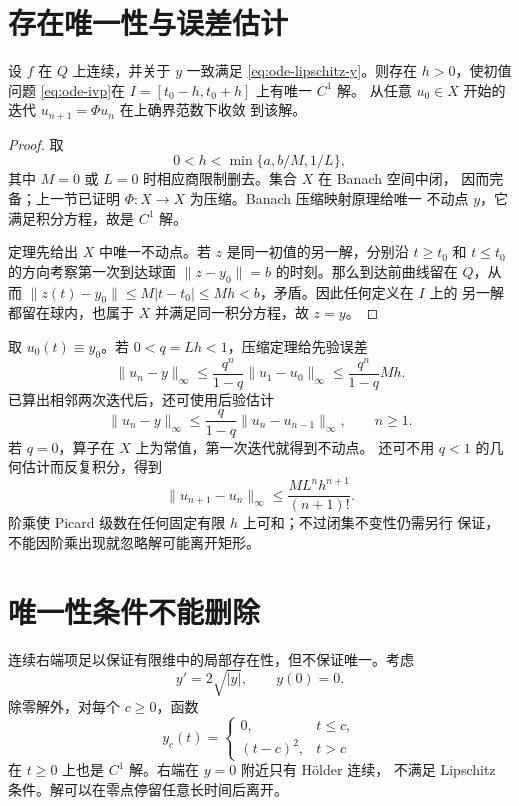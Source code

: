 \section{存在唯一性与误差估计}

\begin{theorem}\label{thm:picard-lindelof}
设 \(f\) 在 \(Q\) 上连续，并关于 \(y\) 一致满足
\eqref{eq:ode-lipschitz-y}。则存在 \(h>0\)，使初值问题
\eqref{eq:ode-ivp}在 \(I=[t_0-h,t_0+h]\) 上有唯一 \(C^1\) 解。
从任意 \(u_0\in X\) 开始的迭代 \(u_{n+1}=\Phi u_n\) 在上确界范数下收敛
到该解。
\end{theorem}
\begin{proof}
取
\[
 0<h<\min\{a,b/M,1/L\},
\]
其中 \(M=0\) 或 \(L=0\) 时相应商限制删去。集合 \(X\) 在 Banach 空间中闭，
因而完备；上一节已证明 \(\Phi:X\to X\) 为压缩。Banach 压缩映射原理给唯一
不动点 \(y\)，它满足积分方程，故是 \(C^1\) 解。

定理先给出 \(X\) 中唯一不动点。若 \(z\) 是同一初值的另一解，分别沿
\(t\ge t_0\) 和 \(t\le t_0\) 的方向考察第一次到达球面
\(\|z-y_0\|=b\) 的时刻。那么到达前曲线留在 \(Q\)，从而
\(\|z(t)-y_0\|\le M|t-t_0|\le Mh<b\)，矛盾。因此任何定义在 \(I\) 上的
另一解都留在球内，也属于 \(X\) 并满足同一积分方程，故 \(z=y\)。
\end{proof}

取 \(u_0(t)\equiv y_0\)。若 \(0<q=Lh<1\)，压缩定理给先验误差
\[
 \|u_n-y\|_\infty\le\frac{q^n}{1-q}\|u_1-u_0\|_\infty
 \le\frac{q^n}{1-q}Mh.
\]
已算出相邻两次迭代后，还可使用后验估计
\[
 \|u_n-y\|_\infty\le\frac q{1-q}\|u_n-u_{n-1}\|_\infty,
 \qquad n\ge1.
\]
若 \(q=0\)，算子在 \(X\) 上为常值，第一次迭代就得到不动点。
还可不用 \(q<1\) 的几何估计而反复积分，得到
\[
 \|u_{n+1}-u_n\|_\infty
 \le \frac{M L^n h^{n+1}}{(n+1)!}.
\]
阶乘使 Picard 级数在任何固定有限 \(h\) 上可和；不过闭集不变性仍需另行
保证，不能因阶乘出现就忽略解可能离开矩形。

\section{唯一性条件不能删除}

连续右端项足以保证有限维中的局部存在性，但不保证唯一。考虑
\[
 y'=2\sqrt{|y|},\qquad y(0)=0.
\]
除零解外，对每个 \(c\ge0\)，函数
\[
 y_c(t)=
 \begin{cases}
 0,&t\le c,\\
 (t-c)^2,&t>c
 \end{cases}
\]
在 \(t\ge0\) 上也是 \(C^1\) 解。右端在 \(y=0\) 附近只有 Hölder 连续，
不满足 Lipschitz 条件。解可以在零点停留任意长时间后离开。

